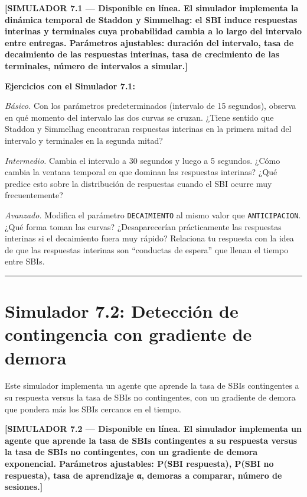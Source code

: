 \documentclass[
  letterpaper,
  DIV=11,
  numbers=noendperiod]{scrreprt}
\begin{document}
\begin{tcolorbox}[enhanced jigsaw, arc=.35mm, bottomrule=.15mm, breakable, colback=white, colframe=quarto-callout-note-color-frame, left=2mm, leftrule=.75mm, opacityback=0, rightrule=.15mm, toprule=.15mm]
\textbf{{[}SIMULADOR 7.1 --- Disponible en línea. El simulador
implementa la dinámica temporal de Staddon y Simmelhag: el SBI induce
respuestas interinas y terminales cuya probabilidad cambia a lo largo
del intervalo entre entregas. Parámetros ajustables: duración del
intervalo, tasa de decaimiento de las respuestas interinas, tasa de
crecimiento de las terminales, número de intervalos a simular.{]}}

\textbf{Ejercicios con el Simulador 7.1:}

\emph{Básico.} Con los parámetros predeterminados (intervalo de 15
segundos), observa en qué momento del intervalo las dos curvas se
cruzan. ¿Tiene sentido que Staddon y Simmelhag encontraran respuestas
interinas en la primera mitad del intervalo y terminales en la segunda
mitad?

\emph{Intermedio.} Cambia el intervalo a 30 segundos y luego a 5
segundos. ¿Cómo cambia la ventana temporal en que dominan las respuestas
interinas? ¿Qué predice esto sobre la distribución de respuestas cuando
el SBI ocurre muy frecuentemente?

\emph{Avanzado.} Modifica el parámetro \texttt{DECAIMIENTO} al mismo
valor que \texttt{ANTICIPACION}. ¿Qué forma toman las curvas?
¿Desaparecerían prácticamente las respuestas interinas si el decaimiento
fuera muy rápido? Relaciona tu respuesta con la idea de que las
respuestas interinas son ``conductas de espera'' que llenan el tiempo
entre SBIs.

\begin{center}\rule{0.5\linewidth}{0.5pt}\end{center}

\section{Simulador 7.2: Detección de contingencia con gradiente de
demora}\label{simulador-7.2-detecciuxf3n-de-contingencia-con-gradiente-de-demora}

Este simulador implementa un agente que aprende la tasa de SBIs
contingentes a su respuesta versus la tasa de SBIs no contingentes, con
un gradiente de demora que pondera más los SBIs cercanos en el tiempo.

\textbf{{[}SIMULADOR 7.2 --- Disponible en línea. El simulador
implementa un agente que aprende la tasa de SBIs contingentes a su
respuesta versus la tasa de SBIs no contingentes, con un gradiente de
demora exponencial. Parámetros ajustables: P(SBI \textbar{} respuesta),
P(SBI \textbar{} no respuesta), tasa de aprendizaje α, demoras a
comparar, número de sesiones.{]}}


\end{tcolorbox}
\end{document}
